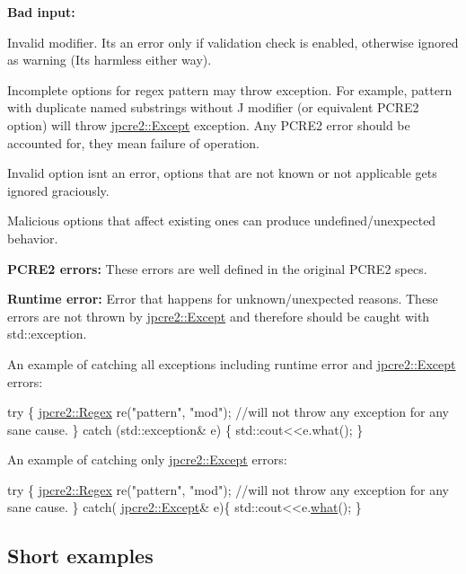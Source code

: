 \begin{DoxyEnumerate}
\item {\bfseries Bad input\+:}
\begin{DoxyEnumerate}
\item Invalid modifier. It\textquotesingle{}s an error only if validation check is enabled, otherwise ignored as warning (It\textquotesingle{}s harmless either way).
\item Incomplete options for regex pattern may throw exception. For example, pattern with duplicate named substrings without \textquotesingle{}J\textquotesingle{} modifier (or equivalent P\+C\+R\+E2 option) will throw {\ttfamily \hyperlink{classjpcre2_1_1Except}{jpcre2\+::\+Except}} exception. Any P\+C\+R\+E2 error should be accounted for, they mean failure of operation.
\item Invalid option isn\textquotesingle{}t an error, options that are not known or not applicable gets ignored graciously.
\item Malicious options that affect existing ones can produce undefined/unexpected behavior.
\end{DoxyEnumerate}
\item {\bfseries P\+C\+R\+E2 errors\+:} These errors are well defined in the original P\+C\+R\+E2 specs.
\item {\bfseries Runtime error\+:} Error that happens for unknown/unexpected reasons. These errors are not thrown by {\ttfamily \hyperlink{classjpcre2_1_1Except}{jpcre2\+::\+Except}} and therefore should be caught with {\ttfamily std\+::exception}.
\end{DoxyEnumerate}

An example of catching all exceptions including runtime error and \hyperlink{classjpcre2_1_1Except}{jpcre2\+::\+Except} errors\+:


\begin{DoxyCode}
\textcolor{keywordflow}{try} \{
    \hyperlink{classjpcre2_1_1Regex}{jpcre2::Regex} re(\textcolor{stringliteral}{"pattern"}, \textcolor{stringliteral}{"mod"}); \textcolor{comment}{//will not throw any exception for any sane cause.}
\} \textcolor{keywordflow}{catch} (std::exception& e) \{
    std::cout<<e.what();
\}
\end{DoxyCode}


An example of catching only \hyperlink{classjpcre2_1_1Except}{jpcre2\+::\+Except} errors\+:


\begin{DoxyCode}
\textcolor{keywordflow}{try} \{
    \hyperlink{classjpcre2_1_1Regex}{jpcre2::Regex} re(\textcolor{stringliteral}{"pattern"}, \textcolor{stringliteral}{"mod"}); \textcolor{comment}{//will not throw any exception for any sane cause.}
\}
\textcolor{keywordflow}{catch}( \hyperlink{classjpcre2_1_1Except}{jpcre2::Except}& e)\{
    std::cout<<e.\hyperlink{classjpcre2_1_1Except_aa16bdec8432ee950955f7ad81a9655bb_aa16bdec8432ee950955f7ad81a9655bb}{what}();
\}
\end{DoxyCode}
\hypertarget{index_short-examples}{}\subsection{Short examples}\label{index_short-examples}


